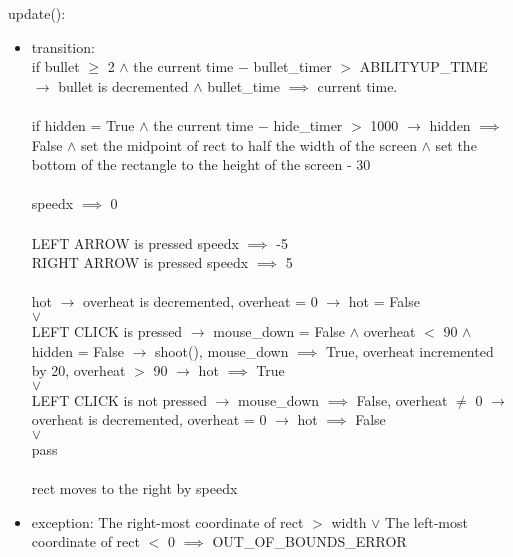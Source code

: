 \documentclass[12pt, titlepage]{article}
\begin{document}
\noindent update(): 
\begin{itemize}
\item transition: \\
if bullet $\geq$ 2 $\wedge$ the current time $-$ bullet\_timer $>$ ABILITYUP\_TIME $\longrightarrow$ bullet is decremented $\wedge$ bullet\_time $\implies$ current time.\\\\
if hidden = True $\wedge$ the current time $-$ hide\_timer $>$ 1000 $\longrightarrow$ hidden $\implies$ False $\wedge$ set the midpoint of rect to half the width of the screen $\wedge$ set the bottom of the rectangle to the height of the screen - 30\\\\
speedx $\implies$ 0\\\\
LEFT ARROW is pressed speedx $\implies$ -5\\
RIGHT ARROW is pressed speedx $\implies$ 5\\\\
hot $\longrightarrow$ overheat is decremented, overheat = 0 $\longrightarrow$ hot = False\\
$\vee$\\
LEFT CLICK is pressed $\longrightarrow$ mouse\_down = False $\wedge$ overheat $<$ 90 $\wedge$ hidden = False $\longrightarrow$ shoot(), mouse\_down $\implies$ True, overheat incremented by 20, overheat $>$ 90 $\longrightarrow$ hot $\implies$ True\\
$\vee$\\
LEFT CLICK is not pressed $\longrightarrow$ mouse\_down $\implies$ False, overheat $\neq$ 0 $\longrightarrow$ overheat is decremented, overheat = 0 $\longrightarrow$ hot $\implies$ False\\
$\vee$\\
pass\\\\
rect moves to the right by speedx

\item exception: The right-most coordinate of rect $>$ width $\vee$ The left-most coordinate of rect $<$ 0 $\implies$ OUT\_OF\_BOUNDS\_ERROR
\end{itemize}
\end{document}
